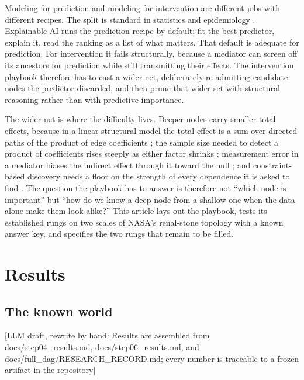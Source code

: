 \documentclass[11pt]{article}
\newcommand{\draftnote}[1]{\textcolor{blue!60!black}{[LLM draft, rewrite by hand: #1]}}
\begin{document}
Modeling for prediction and modeling for intervention are different jobs
with different recipes. The split is standard in statistics and
epidemiology \citep{Shmueli2010,Hernan2019,Harrell2015}. Explainable AI runs
the prediction recipe by default: fit the best predictor, explain it, read
the ranking as a list of what matters. That default is adequate for
prediction. For intervention it fails structurally, because a mediator can
screen off its ancestors for prediction while still transmitting their
effects. The intervention playbook therefore has to cast a wider net,
deliberately re-admitting candidate nodes the predictor discarded, and then
prune that wider set with structural reasoning rather than with predictive
importance.

The wider net is where the difficulty lives. Deeper nodes carry smaller
total effects, because in a linear structural model the total effect is a
sum over directed paths of the product of edge coefficients
\citep{Wright1934,Bollen1987,Sobel1987}; the sample size needed to detect a
product of coefficients rises steeply as either factor shrinks
\citep{FritzMacKinnon2007}; measurement error in a mediator biases the
indirect effect through it toward the null \citep{VanderWeele2012,Hutcheon2010};
and constraint-based discovery needs a floor on the strength of every
dependence it is asked to find \citep{ZhangSpirtes2003,Uhler2013}. The
question the playbook has to answer is therefore not ``which node is
important'' but ``how do we know a deep node from a shallow one when the
data alone make them look alike?'' This article lays out the playbook, tests
its established rungs on two scales of NASA's renal-stone topology with a
known answer key, and specifies the two rungs that remain to be filled.

\section{Results}

\subsection{The known world}
\draftnote{Results are assembled from docs/step04\_results.md,
docs/step06\_results.md, and docs/full\_dag/RESEARCH\_RECORD.md; every
number is traceable to a frozen artifact in the repository}
\end{document}
